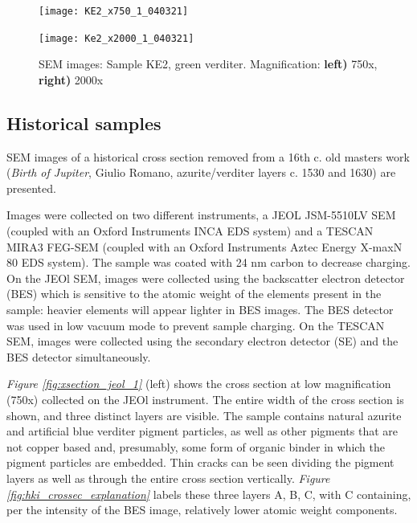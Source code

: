 \begin{figure}[H]
\centering
\begin{minipage}{.45\textwidth}
  \centering
  \texttt{[image: KE2\_x750\_1\_040321]}
\end{minipage}
\begin{minipage}{.45\textwidth}
  \centering
  \texttt{[image: Ke2\_x2000\_1\_040321]}
\end{minipage}
\caption[SEM images: Sample KE2, green verditer]{SEM images: Sample KE2, green verditer. Magnification: \textbf{left)} 750x, \textbf{right)} 2000x}
\label{fig:KE2_sem_1}
\end{figure}


\subsection[Historical samples]{Historical samples}
\label{subsection3.1.3}

SEM images of a historical cross section removed from a 16th c. old masters work (\textit{Birth of Jupiter}, Giulio Romano, azurite/verditer layers c. 1530 and 1630) are presented.

Images were collected on two different instruments, a JEOL JSM-5510LV SEM (coupled with an Oxford Instruments INCA EDS system) and a TESCAN MIRA3 FEG-SEM (coupled with an Oxford Instruments Aztec Energy X-maxN 80 EDS system). The sample was coated with 24 nm carbon to decrease charging. On the JEOl SEM, images were collected using the backscatter electron detector (BES) which is sensitive to the atomic weight of the elements present in the sample: heavier elements will appear lighter in BES images. The BES detector was used in low vacuum mode to prevent sample charging. On the TESCAN SEM, images were collected using the secondary electron detector (SE) and the BES detector simultaneously. 

\textit{Figure \ref{fig:xsection_jeol_1}} (left) shows the cross section at low magnification (750x) collected on the JEOl instrument. The entire width of the cross section is shown, and three distinct layers are visible. The sample contains natural azurite and artificial blue verditer pigment particles, as well as other pigments that are not copper based and, presumably, some form of organic binder in which the pigment particles are embedded. Thin cracks can be seen dividing the pigment layers as well as through the entire cross section vertically. \textit{Figure \ref{fig:hki_crossec_explanation}} labels these three layers A, B, C, with C containing, per the intensity of the BES image, relatively lower atomic weight components. 

